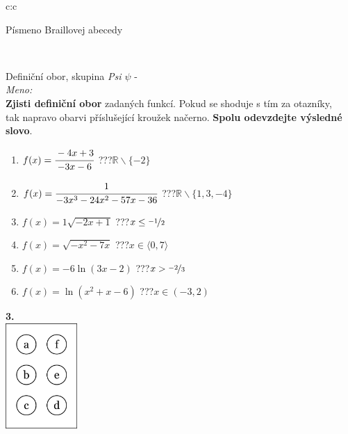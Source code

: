 \documentclass[10pt]{report}
\begin{document}
\begin{tabular}{c:c}
\begin{minipage}[c][99mm][t]{0.49\linewidth}
\begin{center}
\begin{minipage}{0.20\linewidth}
\begin{center}
{\small Písmeno Braillovej abecedy}
\end{center}
\end{minipage}
\end{center}
\end{minipage}
\\ \hdashline
\begin{minipage}[c][99mm][t]{0.49\linewidth}
\begin{center}
\vspace{7mm}
{\huge Definiční obor, skupina \textit{Psi $\psi$} -}\\[4.5mm]
\textit{Meno:}\phantom{xxxxxxxxxxxxxxxxxxxxxxxxxxxxxxxxxxxxxxxxxxxxxxxxxxxxxxxxxxxxxxxxx}\\[3.5mm]
\textbf{Zjisti definiční obor} zadaných funkcí. Pokud se shoduje s tím za otazníky,\\tak napravo obarvi příslušející kroužek načerno. \textbf{Spolu odevzdejte výsledné slovo}.\\[3mm]
\begin{minipage}{0.77\linewidth}
\begin{center}
\begin{varwidth}{\textwidth}
\begin{enumerate}
\normalsize
\item $f(x)=\cfrac{-4x+3}{-3x-6}$\quad \dotfill\; ???\;\dotfill \quad $\mathbb{R}\smallsetminus\{-2\}$
\item $f(x)=\cfrac{1}{-3x^3-24x^2-57x-36}$\quad \dotfill\; ???\;\dotfill \quad $\mathbb{R}\smallsetminus\{1,3,-4\}$
\item $f(x)=1\sqrt{-2x+1}$\quad \dotfill\; ???\;\dotfill \quad $x\leq\nicefrac{-1}{2}$
\item $f(x)=\sqrt{-x^2-7x}$\quad \dotfill\; ???\;\dotfill \quad $x\in\langle0 , 7\rangle$
\item $f(x)=-6\ln{(3x-2)}$\quad \dotfill\; ???\;\dotfill \quad $x>\nicefrac{-2}{3}$
\item $f(x)=\ln{(x^2+x-6)}$\quad \dotfill\; ???\;\dotfill \quad $x\in(-3 , 2)$
\end{enumerate}
\end{varwidth}
\end{center}
\end{minipage}
\begin{minipage}{0.20\linewidth}
\begin{center}
{\Huge\bfseries 3.} \\[2mm]
\includegraphics[height=40mm]{../images/braille.png}

\end{center}
\end{minipage}
\end{center}
\end{minipage}
\end{tabular}
\end{document}
